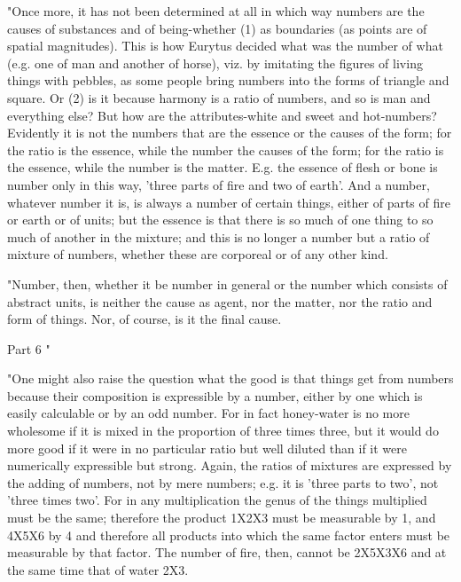 "Once more, it has not been determined at all in which way numbers
are the causes of substances and of being-whether (1) as boundaries
(as points are of spatial magnitudes). This is how Eurytus decided
what was the number of what (e.g. one of man and another of horse),
viz. by imitating the figures of living things with pebbles, as some
people bring numbers into the forms of triangle and square. Or (2)
is it because harmony is a ratio of numbers, and so is man and everything
else? But how are the attributes-white and sweet and hot-numbers?
Evidently it is not the numbers that are the essence or the causes
of the form; for the ratio is the essence, while the number the causes
of the form; for the ratio is the essence, while the number is the
matter. E.g. the essence of flesh or bone is number only in this way,
'three parts of fire and two of earth'. And a number, whatever number
it is, is always a number of certain things, either of parts of fire
or earth or of units; but the essence is that there is so much of
one thing to so much of another in the mixture; and this is no longer
a number but a ratio of mixture of numbers, whether these are corporeal
or of any other kind. 

"Number, then, whether it be number in general or the number which
consists of abstract units, is neither the cause as agent, nor the
matter, nor the ratio and form of things. Nor, of course, is it the
final cause. 

Part 6 "

"One might also raise the question what the good is that things get
from numbers because their composition is expressible by a number,
either by one which is easily calculable or by an odd number. For
in fact honey-water is no more wholesome if it is mixed in the proportion
of three times three, but it would do more good if it were in no particular
ratio but well diluted than if it were numerically expressible but
strong. Again, the ratios of mixtures are expressed by the adding
of numbers, not by mere numbers; e.g. it is 'three parts to two',
not 'three times two'. For in any multiplication the genus of the
things multiplied must be the same; therefore the product 1X2X3 must
be measurable by 1, and 4X5X6 by 4 and therefore all products into
which the same factor enters must be measurable by that factor. The
number of fire, then, cannot be 2X5X3X6 and at the same time that
of water 2X3. 

